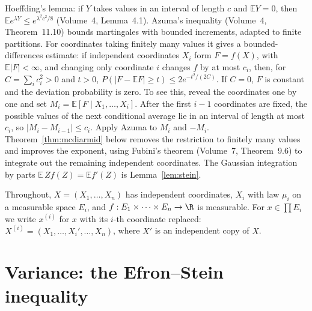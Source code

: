 \begin{reminder}
Hoeffding's lemma: if $Y$ takes values in an interval of length $c$ and $\mathbb EY=0$, then $\mathbb Ee^{\lambda Y}\le e^{\lambda^2c^2/8}$ (Volume~4, Lemma~4.1).
Azuma's inequality (Volume~4, Theorem~11.10) bounds martingales with bounded increments, adapted to finite partitions. For coordinates taking finitely many values it gives a bounded-differences estimate: if independent coordinates $X_i$ form $F=f(X)$, with $\mathbb E|F|<\infty$, and changing only coordinate $i$ changes $f$ by at most $c_i$, then, for $C=\sum_i c_i^2>0$ and $t>0$,
$P(|F-\mathbb EF|\ge t)\le2e^{-t^2/(2C)}$. If $C=0$, $F$ is constant and the deviation probability is zero. To see this, reveal the coordinates one by one and set $M_i=\mathbb E[F\mid X_1,\dots,X_i]$. After the first $i-1$ coordinates are fixed, the possible values of the next conditional average lie in an interval of length at most $c_i$, so $|M_i-M_{i-1}|\le c_i$. Apply Azuma to $M_i$ and $-M_i$. Theorem~\ref{thm:mcdiarmid} below removes the restriction to finitely many values and improves the exponent, using Fubini's theorem (Volume~7, Theorem~9.6) to integrate out the remaining independent coordinates. The Gaussian integration by parts $\mathbb E\,Zf(Z)=\mathbb Ef'(Z)$ is Lemma~\ref{lem:stein}.
\end{reminder}

Throughout, $X=(X_1,\dots,X_n)$ has independent coordinates, $X_i$ with law $\mu_i$ on a measurable space $E_i$, and $f:E_1\times\dots\times E_n\to\R$ is measurable. For
$x\in\prod E_i$ we write $x^{(i)}$ for $x$ with its $i$-th coordinate replaced: $X^{(i)}=(X_1,\dots,X_i',\dots,X_n)$, where $X'$ is an independent copy of $X$.

\section{Variance: the Efron--Stein inequality}

